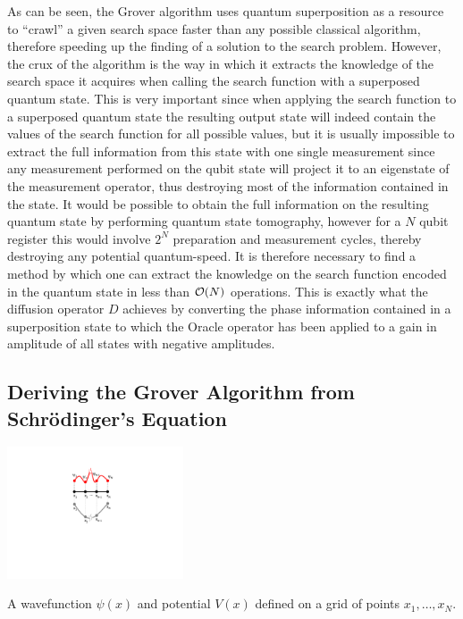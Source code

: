 As can be seen, the Grover algorithm uses quantum superposition as a resource to ``crawl'' a given search space faster than any possible classical algorithm, therefore speeding up the finding of a solution to the search problem. However, the crux of the algorithm is the way in which it extracts the knowledge of the search space it acquires when calling the search function with a superposed quantum state. This is very important since when applying the search function to a superposed quantum state the resulting output state will indeed contain the values of the search function for all possible values, but it is usually impossible to extract the full information from this state with one single measurement since any measurement performed on the qubit state will project it to an eigenstate of the measurement operator, thus destroying most of the information contained in the state. It would be possible to obtain the full information on the resulting quantum state by performing quantum state tomography, however for a $N$ qubit register this would involve $2^N$ preparation and measurement cycles, thereby destroying any potential quantum-speed. It is therefore necessary to find a method by which one can extract the knowledge on the search function encoded in the quantum state in less than $\begin{mathcal}O\end{mathcal}(N)$ operations. This is exactly what the diffusion operator $D$ achieves by converting the phase information contained in a superposition state to which the Oracle operator has been applied to a gain in amplitude of all states with negative amplitudes.

\subsection{Deriving the Grover Algorithm from Schrödinger's Equation}

\begin{floatingfigure}[r]{5.5cm}
\includegraphics[width=5.2cm]{"./material/papers/grover/grover_derivation_schroedinger"}
\caption{A wavefunction $\psi(x)$ and potential $V(x)$ defined on a grid of points $x_1,\hdots,x_N$.}
\label{fig:GroverDerivationSchroedinger}
\end{floatingfigure}

